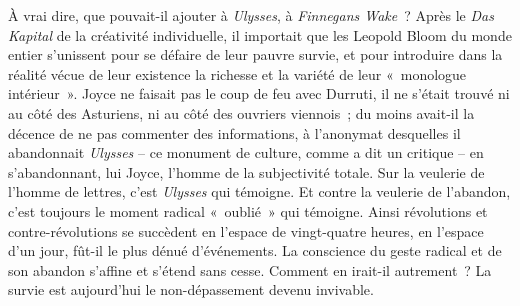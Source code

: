 \documentclass[french,twoside]{book} %
\begin{document}
\noindent À vrai dire, que pouvait-il ajouter à \emph{Ulysses}, à \emph{Finnegans Wake} ? Après le \emph{Das Kapital} de la créativité individuelle, il importait que les Leopold Bloom du monde entier s’unissent pour se défaire de leur pauvre survie, et pour introduire dans la réalité vécue de leur existence la richesse et la variété de leur « monologue intérieur ». Joyce ne faisait pas le coup de feu avec Durruti, il ne s’était trouvé ni au côté des Asturiens, ni au côté des ouvriers viennois ; du moins avait-il la décence de ne pas commenter des informations, à l’anonymat desquelles il abandonnait \emph{Ulysses} – ce monument de culture, comme a dit un critique – en s’abandonnant, lui Joyce, l’homme de la subjectivité totale. Sur la veulerie de l’homme de lettres, c’est \emph{Ulysses} qui témoigne. Et contre la veulerie de l’abandon, c’est toujours le moment radical « oublié » qui témoigne. Ainsi révolutions et contre-révolutions se succèdent en l’espace de vingt-quatre heures, en l’espace d’un jour, fût-il le plus dénué d’événements. La conscience du geste radical et de son abandon s’affine et s’étend sans cesse. Comment en irait-il autrement ? La survie est aujourd’hui le non-dépassement devenu invivable.
\end{document}
